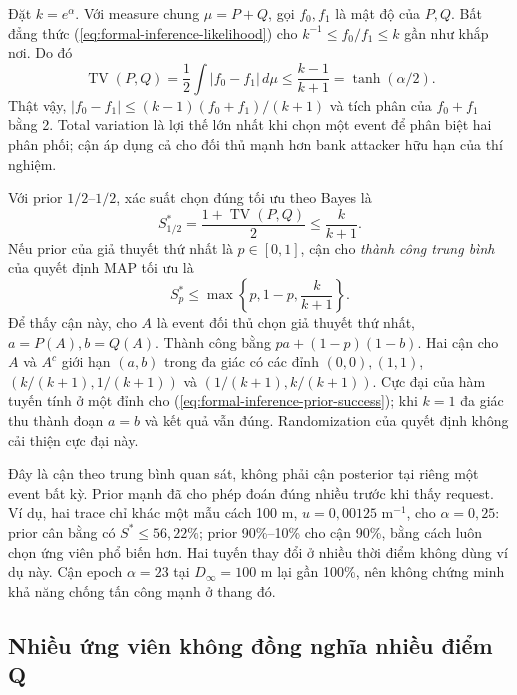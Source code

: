 Đặt $k=e^\alpha$. Với measure chung $\mu=P+Q$, gọi $f_0,f_1$ là mật độ
của $P,Q$. Bất đẳng thức (\ref{eq:formal-inference-likelihood}) cho
$k^{-1}\leq f_0/f_1\leq k$ gần như khắp nơi. Do đó
\begin{equation}
 \operatorname{TV}(P,Q)
 =\frac12\int|f_0-f_1|\,d\mu
 \leq\frac{k-1}{k+1}=\tanh(\alpha/2).
 \label{eq:formal-inference-tv}
\end{equation}
Thật vậy, $|f_0-f_1|\leq (k-1)(f_0+f_1)/(k+1)$ và tích phân của
$f_0+f_1$ bằng 2. Total variation là lợi thế lớn nhất khi chọn một event
để phân biệt hai phân phối; cận áp dụng cả cho đối thủ mạnh hơn bank
attacker hữu hạn của thí nghiệm.

Với prior $1/2$--$1/2$, xác suất chọn đúng tối ưu theo Bayes là
\begin{equation}
 S^*_{1/2}=\frac{1+\operatorname{TV}(P,Q)}2
 \leq\frac{k}{k+1}.
 \label{eq:formal-inference-balanced-success}
\end{equation}
Nếu prior của giả thuyết thứ nhất là $p\in[0,1]$, cận cho \emph{thành công
trung bình} của quyết định MAP tối ưu là
\begin{equation}
 S^*_p\leq\max\left\{p,1-p,\frac{k}{k+1}\right\}.
 \label{eq:formal-inference-prior-success}
\end{equation}
Để thấy cận này, cho $A$ là event đối thủ chọn giả thuyết thứ nhất,
$a=P(A),b=Q(A)$. Thành công bằng $pa+(1-p)(1-b)$. Hai cận cho $A$ và
$A^c$ giới hạn $(a,b)$ trong đa giác có các đỉnh $(0,0),(1,1)$,
$(k/(k+1),1/(k+1))$ và $(1/(k+1),k/(k+1))$. Cực đại của hàm tuyến tính
ở một đỉnh cho (\ref{eq:formal-inference-prior-success}); khi $k=1$ đa
giác thu thành đoạn $a=b$ và kết quả vẫn đúng. Randomization của quyết
định không cải thiện cực đại này.

Đây là cận theo trung bình quan sát, không phải cận posterior tại riêng
một event bất kỳ. Prior mạnh đã cho phép đoán đúng nhiều trước khi thấy
request. Ví dụ, hai trace chỉ khác một mẫu cách 100 m, $u=0{,}00125$
$\mathrm m^{-1}$, cho $\alpha=0{,}25$: prior cân bằng có
$S^*\leq56{,}22\%$; prior 90\%--10\% cho cận 90\%, bằng cách luôn chọn
ứng viên phổ biến hơn. Hai tuyến thay đổi ở nhiều thời điểm không dùng
ví dụ này. Cận epoch $\alpha=23$ tại $D_\infty=100$ m lại gần 100\%,
nên không chứng minh khả năng chống tấn công mạnh ở thang đó.

\subsection{Nhiều ứng viên không đồng nghĩa nhiều điểm Q}
\label{sec:formal-inference-multiple}


